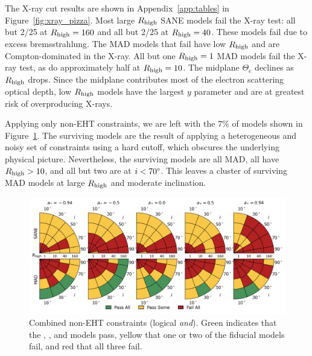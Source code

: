 The X-ray cut results are shown in Appendix~\ref{app:tables} in Figure~\ref{fig:xray_pizza}.
Most large $R_\mathrm{high}$ SANE models fail the X-ray test: all but 2/25 at $R_\mathrm{high} = 160$ and all but 2/25 at $R_\mathrm{high} = 40$.
These models fail due to excess bremsstrahlung.
The MAD models that fail have low $R_\mathrm{high}$ and are Compton-dominated in the X-ray.
All but one $R_\mathrm{high} = 1$ MAD models fail the X-ray test, as do approximately half at $R_\mathrm{high} = 10$.
The midplane $\Theta_e$ declines as $R_\mathrm{high}$ drops.
Since the midplane contributes most of the electron scattering optical depth, low $R_\mathrm{high}$ models have the largest $y$ parameter and are at greatest risk of overproducing X-rays.


Applying only non-EHT constraints, we are left with the $7\%$ of models shown in Figure~\ref{fig:non_eht_cuts}.
The surviving models are the result of applying a heterogeneous and noisy set of constraints using a hard cutoff, which obscures the underlying physical picture.
Nevertheless, the surviving models are all MAD, all have $R_\mathrm{high} > 10$, and all but two are at $i < 70\degree$.
This leaves a cluster of surviving MAD models at large $R_\mathrm{high}$ and moderate inclination.

\begin{figure}\label{fig:non_eht_cuts}
  \centering
  \includegraphics[width=\textwidth]{./figures/Non_Interferometric_Constraints.png}
  \caption{Combined non-EHT constraints (logical {\em and}).
Green indicates that the \kharma, \bhac, and \hamr models pass, yellow that one or two of the fiducial models fail, and red that all three fail.}
\end{figure}

